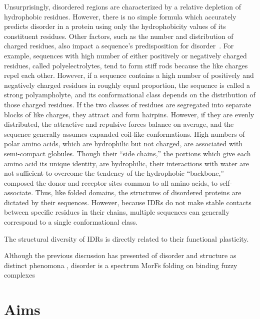 Unsurprisingly, disordered regions are characterized by a relative depletion of hydrophobic residues. However, there is no simple formula which accurately predicts disorder in a protein using only the hydrophobicity values of its constituent residues. Other factors, such as the number and distribution of charged residues, also impact a sequence's predisposition for disorder~\cite{vanderLee2014, Das2015}. For example, sequences with high number of either positively or negatively charged residues, called polyelectrolytes, tend to form stiff rods because the like charges repel each other. However, if a sequence contains a high number of positively and negatively charged residues in roughly equal proportion, the sequence is called a strong polyampholyte, and its conformational class depends on the distribution of those charged residues. If the two classes of residues are segregated into separate blocks of like charges, they attract and form hairpins. However, if they are evenly distributed, the attractive and repulsive forces balance on average, and the sequence generally assumes expanded coil-like conformations. High numbers of polar amino acids, which are hydrophilic but not charged, are associated with semi-compact globules. Though their ``side chains,'' the portions which give each amino acid its unique identity, are hydrophilic, their interactions with water are not sufficient to overcome the tendency of the hydrophobic ``backbone,'' composed the donor and receptor sites common to all amino acids, to self-associate. Thus, like folded domains, the structures of disordered proteins are dictated by their sequences. However, because IDRs do not make stable contacts between specific residues in their chains, multiple sequences can generally correspond to a single conformational class.

The structural diversity of IDRs is directly related to their functional plasticity.

Although the previous discussion has presented of disorder and structure as distinct phenomona , disorder is a spectrum
MorFs
folding on binding
fuzzy complexes

\section{Aims}

